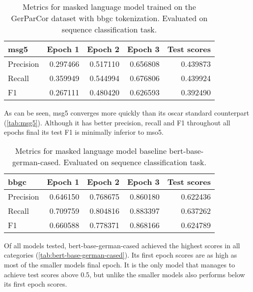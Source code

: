 \begin{table}[H]
\centering
\caption[Metrics for model msg5]{Metrics for masked language model trained on the GerParCor dataset with \ac{bbgc} tokenization. Evaluated on sequence classification task.}
\label{tab:msg5}
\begin{tabular}{lrrrr}
    \toprule
    \textbf{msg5} & \textbf{Epoch 1} & \textbf{Epoch 2} & \textbf{Epoch 3} & \textbf{Test scores} \\
    \midrule
    Precision & 0.297466 & 0.517110 & 0.656808 & 0.439873 \\
    Recall & 0.359949 & 0.544994 & 0.676806 & 0.439924 \\
    F1 & 0.267111 & 0.480420 & 0.626593 & 0.392490 \\
    \bottomrule
\end{tabular}
\end{table}

As can be seen, msg5 converges more quickly than its oscar standard counterpart (\autoref{tab:msg5}).
Although it has better precision, recall and F1 throughout all epochs final its test F1 is minimally inferior to mso5.

\begin{table}[H]
    \centering
    \caption[Metrics for model bbgc]{Metrics for masked language model baseline bert-base-german-cased. Evaluated on sequence classification task.}
    \label{tab:bert-base-german-cased}
    \begin{tabular}{lrrrr}
        \toprule
        \textbf{bbgc} & \textbf{Epoch 1} & \textbf{Epoch 2} & \textbf{Epoch 3} & \textbf{Test scores} \\
        \midrule
        Precision & 0.646150 & 0.768675 & 0.860180 & 0.622436 \\
        Recall & 0.709759 & 0.804816 & 0.883397 & 0.637262 \\
        F1 & 0.660588 & 0.778371 & 0.868166 & 0.624789 \\
        \bottomrule
    \end{tabular}
\end{table}

Of all models tested, bert-base-german-cased achieved the highest scores in all categories (\autoref{tab:bert-base-german-cased}).
Its first epoch scores are as high as most of the smaller models final epoch.
It is the only model that manages to achieve test scores above 0.5, but unlike the smaller models also performs below its first epoch scores.


